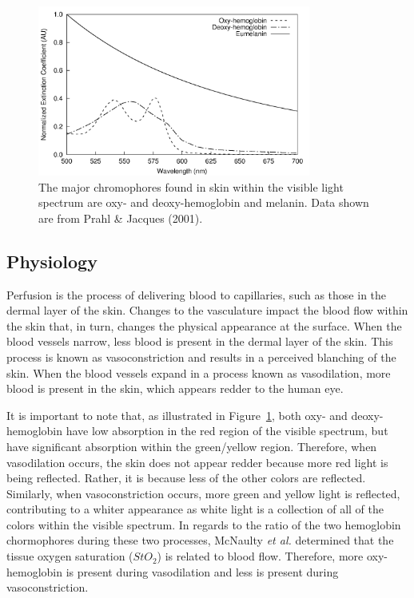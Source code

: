 \begin{figure}
	\centering \includegraphics[width=0.8\textwidth]{figures/intro-skin_chromophores.png}
	\caption[The major chromophores of skin within the visible light spectrum]{\label{fig:intro-skin_chromophores}The major chromophores found in skin within the visible light spectrum are oxy- and deoxy-hemoglobin and melanin. Data shown are from Prahl \& Jacques (2001).\cite{Prahl2001}}
\end{figure}

\subsection{Physiology}
Perfusion is the process of delivering blood to capillaries, such as those in the dermal layer of the skin. Changes to the vasculature impact the blood flow within the skin that, in turn, changes the physical appearance at the surface. When the blood vessels narrow, less blood is present in the dermal layer of the skin. This process is known as vasoconstriction and results in a perceived blanching of the skin. When the blood vessels expand in a process known as vasodilation, more blood is present in the skin, which appears redder to the human eye.

It is important to note that, as illustrated in Figure~\ref{fig:intro-skin_chromophores}, both oxy- and deoxy-hemoglobin have low absorption in the red region of the visible spectrum, but have significant absorption within the green/yellow region. Therefore, when vasodilation occurs, the skin does not appear redder because more red light is being reflected. Rather, it is because less of the other colors are reflected. Similarly, when vasoconstriction occurs, more green and yellow light is reflected, contributing to a whiter appearance as white light is a collection of all of the colors within the visible spectrum. In regards to the ratio of the two hemoglobin chormophores during these two processes, McNaulty \emph{et al.} determined that the tissue oxygen saturation ($StO_2$) is related to blood flow.\cite{McNulty2011} Therefore, more oxy-hemoglobin is present during vasodilation and less is present during vasoconstriction.

